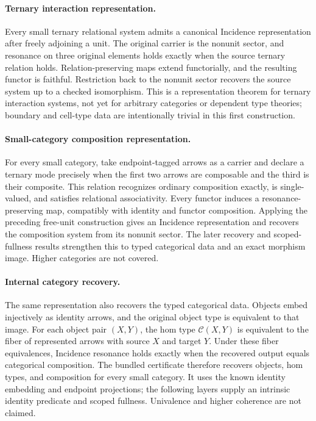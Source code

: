 \documentclass[11pt]{article}
\theoremstyle{definition}
\begin{document}
\paragraph{Ternary interaction representation.}
Every small ternary relational system admits a canonical Incidence
representation after freely adjoining a unit.  The original carrier is the
nonunit sector, and resonance on three original elements holds exactly when
the source ternary relation holds.  Relation-preserving maps extend
functorially, and the resulting functor is faithful.  Restriction back to the
nonunit sector recovers the source system up to a checked isomorphism.  This is
a representation theorem for ternary interaction systems, not yet for
arbitrary categories or dependent type theories; boundary and cell-type data
are intentionally trivial in this first construction.

\paragraph{Small-category composition representation.}
For every small category, take endpoint-tagged arrows as a carrier and declare
a ternary mode precisely when the first two arrows are composable and the
third is their composite.  This relation recognizes ordinary composition
exactly, is single-valued, and satisfies relational associativity.  Every
functor induces a resonance-preserving map, compatibly with identity and
functor composition.  Applying the preceding free-unit construction gives an
Incidence representation and recovers the composition system from its nonunit
sector.  The later recovery and scoped-fullness results strengthen this to
typed categorical data and an exact morphism image. Higher categories are not
covered.

\paragraph{Internal category recovery.}
The same representation also recovers the typed categorical data.  Objects
embed injectively as identity arrows, and the original object type is
equivalent to that image.  For each object pair $(X,Y)$, the hom type
$\mathcal C(X,Y)$ is equivalent to the fiber of represented arrows with source
$X$ and target $Y$.  Under these fiber equivalences, Incidence resonance holds
exactly when the recovered output equals categorical composition.  The bundled
certificate therefore recovers objects, hom types, and composition for every
small category.  It uses the known identity embedding and endpoint
projections; the following layers supply an intrinsic identity predicate and
scoped fullness. Univalence and higher coherence are not claimed.
\end{document}
